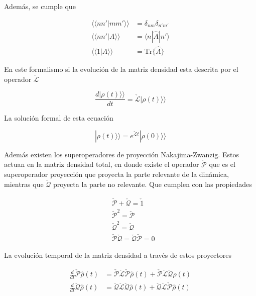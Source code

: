 Además, se cumple que 

\begin{align*}
    \langle \langle nn'|mm'\rangle \rangle & = \delta_{nm}\delta_{n'm'}\\
    \langle \langle nn'|A\rangle \rangle & = \langle n|\hat{A}|n'\rangle \\
    \langle \langle 1|A\rangle \rangle & = \text{Tr}\{\hat{A}\} 
\end{align*}

En este formalismo si la evolución de la matriz densidad esta descrita por el operador $\check{\mathcal{L}}$

\begin{equation*}
    \frac{d|\rho(t) \rangle \rangle}{dt} = \check{\mathcal{L}}|\rho(t) \rangle \rangle
\end{equation*}

La solución formal de esta ecuación

\begin{equation}
    |\rho(t)\rangle \rangle = e^{\check{\mathcal{L}}t}|\rho(0)\rangle \rangle 
    \label{sec2liouvilleformal}
\end{equation}

Además existen los superoperadores de proyección Nakajima-Zwanzig\cite{zwanzig1966statistical}. Estos actuan en la matriz densidad total, en donde existe el operador  $\check{\mathcal{P}}$ que es el superoperador proyección que proyecta la parte relevante de la dinámica, mientras que $\check{\mathcal{Q}}$ proyecta la parte no relevante. Que cumplen con las propiedades

\begin{align*}
    & \check{\mathcal{P}} + \check{\mathcal{Q}} = \check{1} \\
    & \check{\mathcal{P}}^{2} = \check{\mathcal{P}} \\
    & \check{\mathcal{Q}}^{2} = \check{\mathcal{Q}} \\
    & \check{\mathcal{P}}\check{\mathcal{Q}} = \check{\mathcal{Q}}\check{\mathcal{P}} = 0 
\end{align*}    

La evolución temporal de la matriz densidad a través de estos proyectores

\begin{align*}
    \frac{d}{dt}\check{\mathcal{P}}\hat{\rho}(t) & = \check{\mathcal{P}}\check{\mathcal{L}}\check{\mathcal{P}}\hat{\rho}(t) + \check{\mathcal{P}}\check{\mathcal{L}}\check{\mathcal{Q}}\hat{\rho}(t) \\
    \frac{d}{dt}\check{\mathcal{Q}}\hat{\rho}(t) & = \check{\mathcal{Q}}\check{\mathcal{L}}\check{\mathcal{Q}}\hat{\rho}(t) + \check{\mathcal{Q}}\check{\mathcal{L}}\check{\mathcal{P}}\hat{\rho}(t)
\end{align*}

